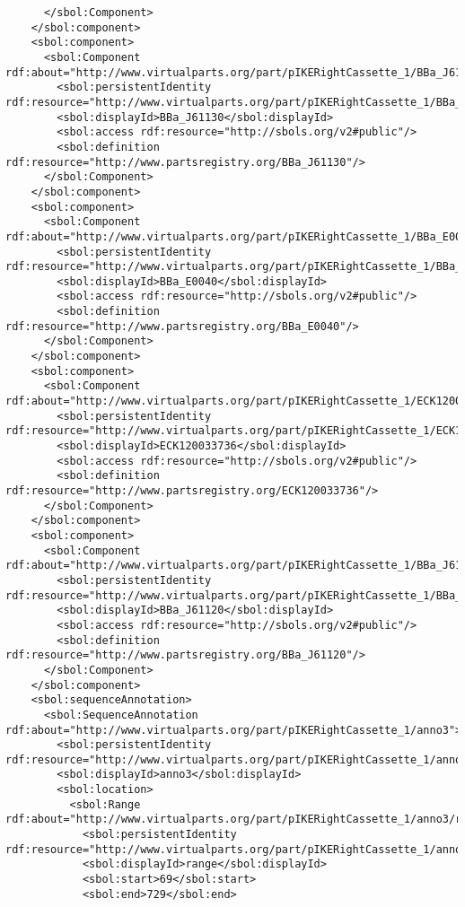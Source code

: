 \begin{lstlisting}
      </sbol:Component>
    </sbol:component>
    <sbol:component>
      <sbol:Component rdf:about="http://www.virtualparts.org/part/pIKERightCassette_1/BBa_J61130">
        <sbol:persistentIdentity rdf:resource="http://www.virtualparts.org/part/pIKERightCassette_1/BBa_J61130"/>
        <sbol:displayId>BBa_J61130</sbol:displayId>
        <sbol:access rdf:resource="http://sbols.org/v2#public"/>
        <sbol:definition rdf:resource="http://www.partsregistry.org/BBa_J61130"/>
      </sbol:Component>
    </sbol:component>
    <sbol:component>
      <sbol:Component rdf:about="http://www.virtualparts.org/part/pIKERightCassette_1/BBa_E0040">
        <sbol:persistentIdentity rdf:resource="http://www.virtualparts.org/part/pIKERightCassette_1/BBa_E0040"/>
        <sbol:displayId>BBa_E0040</sbol:displayId>
        <sbol:access rdf:resource="http://sbols.org/v2#public"/>
        <sbol:definition rdf:resource="http://www.partsregistry.org/BBa_E0040"/>
      </sbol:Component>
    </sbol:component>
    <sbol:component>
      <sbol:Component rdf:about="http://www.virtualparts.org/part/pIKERightCassette_1/ECK120033736">
        <sbol:persistentIdentity rdf:resource="http://www.virtualparts.org/part/pIKERightCassette_1/ECK120033736"/>
        <sbol:displayId>ECK120033736</sbol:displayId>
        <sbol:access rdf:resource="http://sbols.org/v2#public"/>
        <sbol:definition rdf:resource="http://www.partsregistry.org/ECK120033736"/>
      </sbol:Component>
    </sbol:component>
    <sbol:component>
      <sbol:Component rdf:about="http://www.virtualparts.org/part/pIKERightCassette_1/BBa_J61120">
        <sbol:persistentIdentity rdf:resource="http://www.virtualparts.org/part/pIKERightCassette_1/BBa_J61120"/>
        <sbol:displayId>BBa_J61120</sbol:displayId>
        <sbol:access rdf:resource="http://sbols.org/v2#public"/>
        <sbol:definition rdf:resource="http://www.partsregistry.org/BBa_J61120"/>
      </sbol:Component>
    </sbol:component>
    <sbol:sequenceAnnotation>
      <sbol:SequenceAnnotation rdf:about="http://www.virtualparts.org/part/pIKERightCassette_1/anno3">
        <sbol:persistentIdentity rdf:resource="http://www.virtualparts.org/part/pIKERightCassette_1/anno3"/>
        <sbol:displayId>anno3</sbol:displayId>
        <sbol:location>
          <sbol:Range rdf:about="http://www.virtualparts.org/part/pIKERightCassette_1/anno3/range">
            <sbol:persistentIdentity rdf:resource="http://www.virtualparts.org/part/pIKERightCassette_1/anno3/range"/>
            <sbol:displayId>range</sbol:displayId>
            <sbol:start>69</sbol:start>
            <sbol:end>729</sbol:end>

\end{lstlisting}
